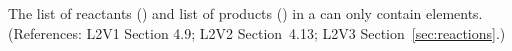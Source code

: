 The list of reactants () and list of products
() in a \Reaction can only contain
 elements.  (References: L2V1 Section 4.9; L2V2
Section~4.13; L2V3 Section~\ref{sec:reactions}.)
